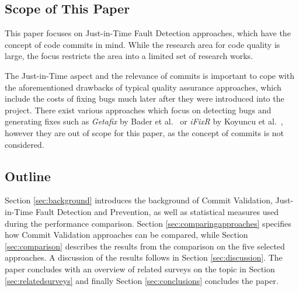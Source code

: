 

\subsection{Scope of This Paper}
\label{sec:scope}


This paper focuses on Just-in-Time Fault Detection approaches, which have the concept of code commits in mind. 
While the research area for code quality is large, the focus restricts the area into a limited set of research works.

The Just-in-Time aspect and the relevance of commits is important to cope with the aforementioned drawbacks of typical quality assurance approaches, which include the costs of fixing bugs much later after they were introduced into the project. 
There exist various approaches which focus on detecting bugs and generating fixes such as \textit{Getafix} by Bader et al.~\cite{Bader2019} or \textit{iFixR} by Koyuncu et al.~\cite{Koyuncu2019}, however they are out of scope for this paper, as the concept of commits is not considered.


\subsection{Outline}
Section \ref{sec:background} introduces the background of Commit Validation, Just-in-Time Fault Detection and Prevention, as well as statistical measures used during the performance comparison.
Section \ref{sec:comparingapproaches} specifies how Commit Validation approaches can be compared, while Section \ref{sec:comparison} describes the results from the comparison on the five selected approaches. A discussion of the results follows in Section \ref{sec:discussion}.
The paper concludes with an overview of related surveys on the topic in Section \ref{sec:relatedsurveys} and finally Section \ref{sec:conclusions} concludes the paper.

